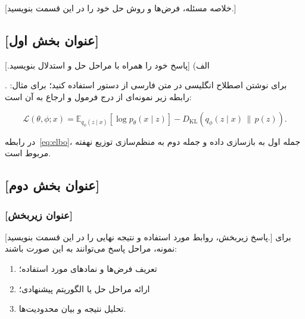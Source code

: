 \label{sec:question1}

[خلاصه مسئله، فرض‌ها و روش حل خود را در این قسمت بنویسید.]

\subsection{[عنوان بخش اول]}

الف) [پاسخ خود را همراه با مراحل حل و استدلال بنویسید.]

برای نوشتن اصطلاح انگلیسی در متن فارسی از دستور
استفاده کنید؛ برای مثال: .
رابطه زیر نمونه‌ای از درج فرمول و ارجاع به آن است:

\begin{equation}
  \mathcal{L}(\theta,\phi;x)
  = \mathbb{E}_{q_\phi(z\mid x)}[\log p_\theta(x\mid z)]
    - D_{\mathrm{KL}}\!\left(q_\phi(z\mid x)\,\|\,p(z)\right).
  \label{eq:elbo}
\end{equation}

در رابطه~\eqref{eq:elbo}، جمله اول به بازسازی داده و جمله دوم به
منظم‌سازی توزیع نهفته مربوط است.

\subsection{[عنوان بخش دوم]}
\subsubsection{[عنوان زیربخش]}

[پاسخ زیربخش، روابط مورد استفاده و نتیجه نهایی را در این قسمت بنویسید.]
برای نمونه، مراحل پاسخ می‌توانند به این صورت باشند:

\begin{enumerate}
  \item تعریف فرض‌ها و نمادهای مورد استفاده؛
  \item ارائه مراحل حل یا الگوریتم پیشنهادی؛
  \item تحلیل نتیجه و بیان محدودیت‌ها.
\end{enumerate}

